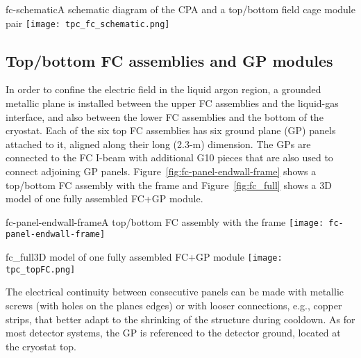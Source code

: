 \begin{cdrfigure}{fc-schematic}{A schematic diagram of the CPA and a top/bottom field cage module pair}
\texttt{[image: tpc\_fc\_schematic.png]}
\end{cdrfigure}

\subsection{Top/bottom FC assemblies and GP modules}

In order to confine the electric field in the liquid argon region, a grounded metallic plane is installed between the upper FC assemblies and the liquid-gas interface, and also between the lower FC assemblies and the bottom of the cryostat. 
Each of the six top FC assemblies has six ground plane (GP) panels attached to it, aligned 
along their long %
(2.3-m) dimension. The GPs are connected to the FC I-beam 
with additional 
G10 pieces that are also used to connect adjoining GP panels. 
Figure~\ref{fig:fc-panel-endwall-frame} shows a top/bottom FC assembly with the frame and 
Figure~\ref{fig:fc_full} shows a 3D model of one fully assembled FC+GP module.

\begin{cdrfigure}{fc-panel-endwall-frame}{A top/bottom FC assembly with the frame}
\texttt{[image: fc-panel-endwall-frame]}
\end{cdrfigure}

\begin{cdrfigure}{fc_full}{3D model of one fully assembled FC+GP module}
\texttt{[image: tpc\_topFC.png]}
\end{cdrfigure}

The electrical continuity between consecutive panels can be made 
with metallic screws (with holes on the planes edges) or with looser connections, e.g., copper strips, that better adapt to the shrinking of the structure during cooldown.  
As for most detector systems, the GP is  referenced to the detector ground, located at the cryostat top.


